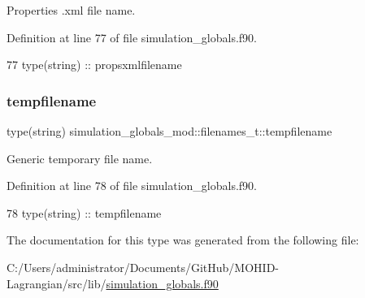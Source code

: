 Properties .xml file name. 



Definition at line 77 of file simulation\+\_\+globals.\+f90.


\begin{DoxyCode}
77         \textcolor{keywordtype}{type}(string) :: propsxmlfilename
\end{DoxyCode}
\mbox{\label{structsimulation__globals__mod_1_1filenames__t_a207bede622cac14f7baef87cf0c000b7}} 
\subsubsection{\texorpdfstring{tempfilename}{tempfilename}}
{\footnotesize\ttfamily type(string) simulation\+\_\+globals\+\_\+mod\+::filenames\+\_\+t\+::tempfilename\hspace{0.3cm}{\ttfamily [private]}}



Generic temporary file name. 



Definition at line 78 of file simulation\+\_\+globals.\+f90.


\begin{DoxyCode}
78         \textcolor{keywordtype}{type}(string) :: tempfilename
\end{DoxyCode}


The documentation for this type was generated from the following file\+:\begin{DoxyCompactItemize}
\item 
C\+:/\+Users/administrator/\+Documents/\+Git\+Hub/\+M\+O\+H\+I\+D-\/\+Lagrangian/src/lib/\mbox{\hyperlink{simulation__globals_8f90}{simulation\+\_\+globals.\+f90}}\end{DoxyCompactItemize}
